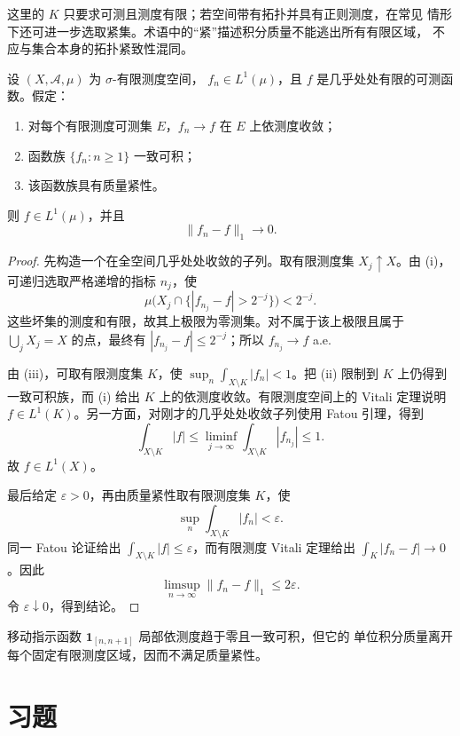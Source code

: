 这里的 \(K\) 只要求可测且测度有限；若空间带有拓扑并具有正则测度，在常见
情形下还可进一步选取紧集。术语中的“紧”描述积分质量不能逃出所有有限区域，
不应与集合本身的拓扑紧致性混同。

\begin{theorem}
\label{thm:vitali-sigma-finite-tight}
设 \((X,\mathcal A,\mu)\) 为 \(\sigma\)-有限测度空间，
\(f_n\in L^1(\mu)\)，且 \(f\) 是几乎处处有限的可测函数。假定：
\begin{enumerate}[label=\textup{(\roman*)}]
 \item 对每个有限测度可测集 \(E\)，\(f_n\to f\) 在 \(E\) 上依测度收敛；
 \item 函数族 \(\{f_n:n\ge1\}\) 一致可积；
 \item 该函数族具有质量紧性。
\end{enumerate}
则 \(f\in L^1(\mu)\)，并且
\[
 \|f_n-f\|_1\longrightarrow0.
\]
\end{theorem}

\begin{proof}
先构造一个在全空间几乎处处收敛的子列。取有限测度集
\(X_j\uparrow X\)。由 (i)，可递归选取严格递增的指标 \(n_j\)，使
\[
 \mu\bigl(X_j\cap\{|f_{n_j}-f|>2^{-j}\}\bigr)<2^{-j}.
\]
这些坏集的测度和有限，故其上极限为零测集。对不属于该上极限且属于
\(\bigcup_jX_j=X\) 的点，最终有
\(|f_{n_j}-f|\le2^{-j}\)；所以 \(f_{n_j}\to f\) a.e.

由 (iii)，可取有限测度集 \(K\)，使
\(\sup_n\int_{X\setminus K}|f_n|<1\)。把 (ii) 限制到 \(K\) 上仍得到
一致可积族，而 (i) 给出 \(K\) 上的依测度收敛。有限测度空间上的 Vitali
定理说明 \(f\in L^1(K)\)。另一方面，对刚才的几乎处处收敛子列使用 Fatou
引理，得到
\[
 \int_{X\setminus K}|f|
 \le\liminf_{j\to\infty}
     \int_{X\setminus K}|f_{n_j}|
 \le1.
\]
故 \(f\in L^1(X)\)。

最后给定 \(\varepsilon>0\)，再由质量紧性取有限测度集 \(K\)，使
\[
 \sup_n\int_{X\setminus K}|f_n|<\varepsilon.
\]
同一 Fatou 论证给出
\(\int_{X\setminus K}|f|\le\varepsilon\)，而有限测度 Vitali 定理给出
\(\int_K|f_n-f|\to0\)。因此
\[
 \limsup_{n\to\infty}\|f_n-f\|_1
 \le 2\varepsilon.
\]
令 \(\varepsilon\downarrow0\)，得到结论。
\end{proof}

移动指示函数 \(\mathbf1_{[n,n+1]}\) 局部依测度趋于零且一致可积，但它的
单位积分质量离开每个固定有限测度区域，因而不满足质量紧性。

\section*{习题}
